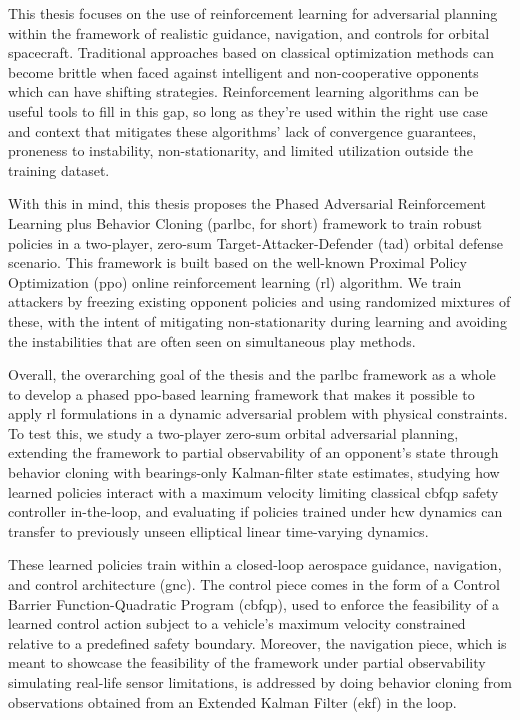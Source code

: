 This thesis focuses on the use of reinforcement learning for adversarial planning within the framework of realistic guidance, navigation, and controls for orbital spacecraft. Traditional approaches based on classical optimization methods can become brittle when faced against intelligent and non-cooperative opponents which can have shifting strategies. Reinforcement learning algorithms can be useful tools to fill in this gap, so long as they're used within the right use case and context that mitigates these algorithms' lack of convergence guarantees, proneness to instability, non-stationarity, and limited utilization outside the training dataset.

With this in mind, this thesis proposes the Phased Adversarial Reinforcement Learning plus Behavior Cloning (\acs{parlbc}, for short) framework to train robust policies in a two-player, zero-sum Target-Attacker-Defender (\acs{tad}) orbital defense scenario. This framework is built based on the well-known Proximal Policy Optimization (\acs{ppo}) online reinforcement learning (\acs{rl}) algorithm. We train attackers by freezing existing opponent policies and using randomized mixtures of these, with the intent of mitigating non-stationarity during learning and avoiding the instabilities that are often seen on simultaneous play methods. 

Overall, the overarching goal of the thesis and the \acs{parlbc} framework as a whole to develop a phased \acs{ppo}-based learning framework that makes it possible to apply \acs{rl} formulations in a dynamic adversarial problem with physical constraints. To test this, we study a two-player zero-sum orbital adversarial planning, extending the framework to partial observability of an opponent's state through behavior cloning with bearings-only Kalman-filter state estimates, studying how learned policies interact with a maximum velocity limiting classical \acs{cbfqp} safety controller in-the-loop, and evaluating if policies trained under \acs{hcw} dynamics can transfer to previously unseen elliptical linear time-varying dynamics.


These learned policies train within a closed-loop aerospace guidance, navigation, and control architecture (\acs{gnc}). The control piece comes in the form of a Control Barrier Function-Quadratic Program (\acs{cbfqp}), used to enforce the feasibility of a learned control action subject to a vehicle's maximum velocity constrained relative to a predefined safety boundary. Moreover, the navigation piece, which is meant to showcase the feasibility of the framework under partial observability simulating real-life sensor limitations, is addressed by doing behavior cloning from observations obtained from an Extended Kalman Filter (\acs{ekf}) in the loop.

